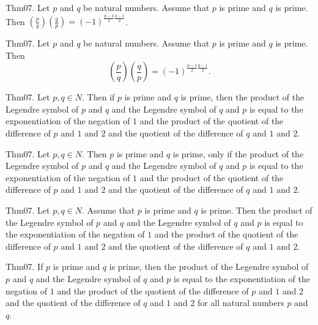 \documentclass{article}
\begin{document}
Thm07. Let $p$ and $q$ be natural numbers. Assume that $p$ is prime and $q$ is prime. Then $\left(\frac{ p }{ q }\right) \left(\frac{ q }{ p }\right) = (- 1)^ {\frac{ p - 1}{2}\frac{ q - 1}{2}}$.

Thm07. Let $p$ and $q$ be natural numbers. Assume that $p$ is prime and $q$ is prime. Then $$\left(\frac{ p }{ q }\right) \left(\frac{ q }{ p }\right) = (- 1)^ {\frac{ p - 1}{2}\frac{ q - 1}{2}}.$$

Thm07. Let $p , q \in N$. Then if $p$ is prime and $q$ is prime, then the product of the Legendre symbol of $p$ and $q$ and the Legendre symbol of $q$ and $p$ is equal to the exponentiation of the negation of $1$ and the product of the quotient of the difference of $p$ and $1$ and $2$ and the quotient of the difference of $q$ and $1$ and $2$.

Thm07. Let $p , q \in N$. Then $p$ is prime and $q$ is prime, only if the product of the Legendre symbol of $p$ and $q$ and the Legendre symbol of $q$ and $p$ is equal to the exponentiation of the negation of $1$ and the product of the quotient of the difference of $p$ and $1$ and $2$ and the quotient of the difference of $q$ and $1$ and $2$.

Thm07. Let $p , q \in N$. Assume that $p$ is prime and $q$ is prime. Then the product of the Legendre symbol of $p$ and $q$ and the Legendre symbol of $q$ and $p$ is equal to the exponentiation of the negation of $1$ and the product of the quotient of the difference of $p$ and $1$ and $2$ and the quotient of the difference of $q$ and $1$ and $2$.

Thm07. If $p$ is prime and $q$ is prime, then the product of the Legendre symbol of $p$ and $q$ and the Legendre symbol of $q$ and $p$ is equal to the exponentiation of the negation of $1$ and the product of the quotient of the difference of $p$ and $1$ and $2$ and the quotient of the difference of $q$ and $1$ and $2$ for all natural numbers $p$ and $q$.
\end{document}

